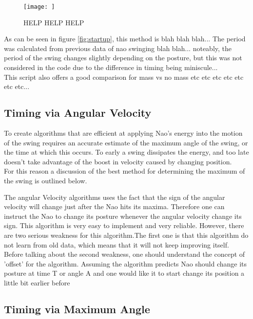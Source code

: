 \documentclass[11pt]{article}
\newcommand*\ruleline[1]{\par\noindent\raisebox{.8ex}{\makebox[\linewidth]{\hrulefill\hspace{1ex}\raisebox{-.8ex}{#1}\hspace{1ex}\hrulefill}}}
\begin{document}
    
    \begin{figure}[!htb]
        \centering
        {\texttt{[image: ]}}
        \caption{HELP HELP HELP}
        \label{fig:test}
    \end{figure}


As can be seen in figure \ref{fig:startup}, this method is blah blah blah... The period was calculated from previous data of nao swinging blah blah... noteably, the period of the swing changes slightly depending on the posture, but this was not considered in the code due to the difference in timing being miniscule... \\

This script also offers a good comparison for mass vs no mass etc etc etc etc etc etc etc...



\subsection{Timing via Angular Velocity}
\ruleline{George Sheppard}
To create algorithms that are efficient at applying Nao's energy into the motion of the swing requires an accurate estimate of the maximum angle of the swing, or the time at which this occurs. To early a swing dissipates the energy, and too late doesn't take advantage of the boost in velocity caused by changing position.\\
For this reason a discussion of the best method for determining the maximum of the swing is outlined below.

\ruleline{Chenglong Li}
The angular Velocity algorithms uses the fact that the sign of the angular velocity will change just after the Nao hits its maxima. Therefore one can instruct the Nao to change its posture whenever the angular velocity change its sign. This algorithm is very easy to implement and very reliable. However, there are two serious weakness for this algorithm.The first one is that this algorithm do not learn from old data, which means that it will not keep improving itself. Before talking about the second weakness, one should understand the concept of 'offset' for the algorithm. Assuming the algorithm predicts Nao should change its posture at time T or angle A and one would like it to start change its position a little bit earlier before  

\subsection{Timing via Maximum Angle}
\end{document}

